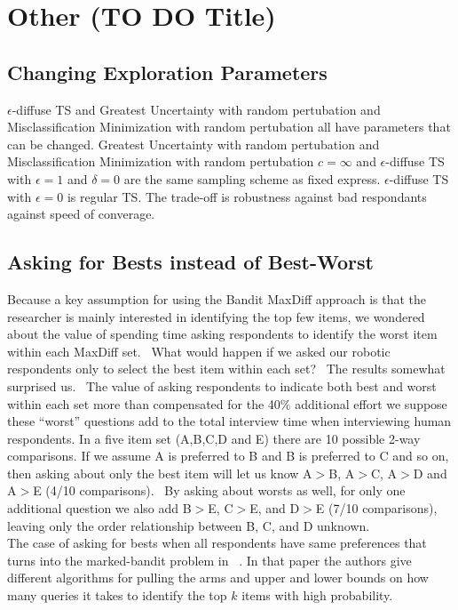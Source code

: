 \documentclass[nonblindrev]{informs3}
\begin{document}
\section{Other (TO DO Title)}
\subsection{Changing Exploration Parameters}
$\epsilon$-diffuse TS and Greatest Uncertainty with random pertubation and Misclassification Minimization with random pertubation all have parameters that can be changed. Greatest Uncertainty with random pertubation and Misclassification Minimization with random pertubation $c=\infty$ and $\epsilon$-diffuse TS with $\epsilon=1$ and $\delta=0$ are the same sampling scheme as fixed express.  $\epsilon$-diffuse TS with $\epsilon=0$ is regular TS. The trade-off is robustness against bad respondants against speed of converage.
\subsection{Asking for Bests instead of Best-Worst}
Because a key assumption for using the Bandit MaxDiff approach is that the researcher is mainly interested in identifying the top few items, we wondered about the value of spending time asking respondents to identify the worst item within each MaxDiff set.  What would happen if we asked our robotic respondents only to select the best item within each set?  The results somewhat surprised us.  The value of asking respondents to indicate both best and worst within each set more than compensated for the 40\% additional effort we suppose these ``worst'' questions add to the total interview time when interviewing human respondents.
In a five item set (A,B,C,D and E) there are 10 possible 2-way comparisons. If we assume A is preferred to B and B is preferred to C and so on, then asking about only the best item will let us know A$>$B, A$>$C, A$>$D and A$>$E (4/10 comparisons).  By asking about worsts as well, for only one additional question we also add B$>$E, C$>$E, and D$>$E (7/10 comparisons), leaving only the order relationship between B, C, and D unknown.\\ 
The case of asking for bests when all respondents have same preferences that turns into the marked-bandit problem in ~\cite{simchowitz2016best}. In that paper the authors give different algorithms for pulling the arms and upper and lower bounds on how many queries it takes to identify the top $k$ items with high probability. 
\end{document}
